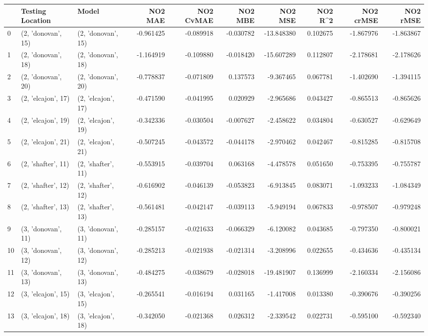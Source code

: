 \begin{tabular}{lllrrrrrrr}
\toprule
{} &    Testing Location &               Model &   NO2 MAE &  NO2 CvMAE &   NO2 MBE &    NO2 MSE &   NO2 R\textasciicircum2 &  NO2 crMSE &  NO2 rMSE \\
\midrule
0  &  (2, 'donovan', 15) &  (2, 'donovan', 15) & -0.961425 &  -0.089918 & -0.030782 & -13.848380 &  0.102675 &  -1.867976 & -1.863867 \\
1  &  (2, 'donovan', 18) &  (2, 'donovan', 18) & -1.164919 &  -0.109880 & -0.018420 & -15.607289 &  0.112807 &  -2.178681 & -2.178626 \\
2  &  (2, 'donovan', 20) &  (2, 'donovan', 20) & -0.778837 &  -0.071809 &  0.137573 &  -9.367465 &  0.067781 &  -1.402690 & -1.394115 \\
3  &  (2, 'elcajon', 17) &  (2, 'elcajon', 17) & -0.471590 &  -0.041995 &  0.020929 &  -2.965686 &  0.043427 &  -0.865513 & -0.865626 \\
4  &  (2, 'elcajon', 19) &  (2, 'elcajon', 19) & -0.342336 &  -0.030504 & -0.007627 &  -2.458622 &  0.034804 &  -0.630527 & -0.629649 \\
5  &  (2, 'elcajon', 21) &  (2, 'elcajon', 21) & -0.507245 &  -0.043572 & -0.044178 &  -2.970462 &  0.042467 &  -0.815285 & -0.815708 \\
6  &  (2, 'shafter', 11) &  (2, 'shafter', 11) & -0.553915 &  -0.039704 &  0.063168 &  -4.478578 &  0.051650 &  -0.753395 & -0.755787 \\
7  &  (2, 'shafter', 12) &  (2, 'shafter', 12) & -0.616902 &  -0.046139 & -0.053823 &  -6.913845 &  0.083071 &  -1.093233 & -1.084349 \\
8  &  (2, 'shafter', 13) &  (2, 'shafter', 13) & -0.561481 &  -0.042147 & -0.039113 &  -5.949194 &  0.067833 &  -0.978507 & -0.979248 \\
9  &  (3, 'donovan', 11) &  (3, 'donovan', 11) & -0.285157 &  -0.021633 & -0.066329 &  -6.120082 &  0.043685 &  -0.797350 & -0.800021 \\
10 &  (3, 'donovan', 12) &  (3, 'donovan', 12) & -0.285213 &  -0.021938 & -0.021314 &  -3.208996 &  0.022655 &  -0.434636 & -0.435134 \\
11 &  (3, 'donovan', 13) &  (3, 'donovan', 13) & -0.484275 &  -0.038679 & -0.028018 & -19.481907 &  0.136999 &  -2.160334 & -2.156086 \\
12 &  (3, 'elcajon', 15) &  (3, 'elcajon', 15) & -0.265541 &  -0.016194 &  0.031165 &  -1.417008 &  0.013380 &  -0.390676 & -0.390256 \\
13 &  (3, 'elcajon', 18) &  (3, 'elcajon', 18) & -0.342050 &  -0.021368 &  0.026312 &  -2.339542 &  0.022731 &  -0.595100 & -0.592340 \\

\end{tabular}
